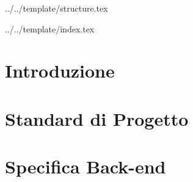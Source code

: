 


\def\DOCUMENTO{Definizione di Prodotto}
\def\VERSIONE{1.0.0}

\def\DESCRIZIONE{Documento che definisce in dettaglio l'architettura del prodotto \PROGETTO.}

\def\REDATTORE {Burlin Valerio \\ & Carraro Nicola \\ & Crespan Emanuele \\ & Ros Fabio}
\def\VERIFICATORE {Agostinetto Matteo}
\def\RESPONSABILE {Suierica Bogdan}

\def\USO {Esterno}

\def\DISTRIBUZIONE {\GRUPPO{}\\ & \COMMITTENTE{}\\ & \PROPONENTE{}\\}

\def\DESCRIZIONE {Documento che definisce in dettaglio l'architettura del prodotto \PROGETTO.}


\def\INDICE	{true}
\def\TABELLE {true}
\def\FIGURE {true}


 {../../template/structure.tex}


 {../../template/index.tex}


\section{Introduzione}

\newpage
\section{Standard di Progetto}

\newpage
\section{Specifica Back-end}

\newpage




